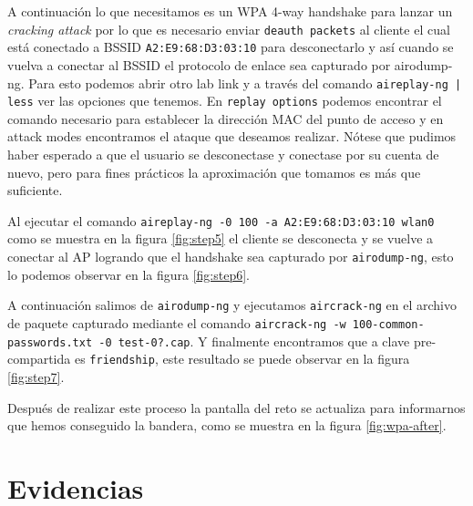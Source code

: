 \documentclass{article}
\begin{document}
        A continuación lo que necesitamos es un WPA 4-way handshake para lanzar un \emph{cracking attack} por lo que es necesario enviar \texttt{deauth packets} al cliente el cual está conectado a BSSID \texttt{A2:E9:68:D3:03:10} para desconectarlo y así cuando se vuelva a conectar al BSSID el protocolo de enlace sea capturado por airodump-ng. Para esto podemos abrir otro lab link y a través del comando \texttt{aireplay-ng | less} ver las opciones que tenemos. En \texttt{replay options} podemos encontrar el comando necesario para establecer la dirección MAC del punto de acceso y en attack modes encontramos el ataque que deseamos realizar. Nótese que pudimos haber esperado a que el usuario se desconectase y conectase por su cuenta de nuevo, pero para fines prácticos la aproximación que tomamos es más que suficiente.

        Al ejecutar el comando \texttt{aireplay-ng -0 100 -a A2:E9:68:D3:03:10 wlan0} como se muestra en la figura \ref{fig:step5} el cliente se desconecta y se vuelve a conectar al AP logrando que el handshake sea capturado por \texttt{airodump-ng}, esto lo podemos observar en la figura \ref{fig:step6}.
        
        A continuación salimos de \texttt{airodump-ng} y ejecutamos \texttt{aircrack-ng} en el archivo de paquete capturado mediante el comando \texttt{aircrack-ng -w 100-common-passwords.txt -0 test-0?.cap}. Y finalmente encontramos que a clave pre-compartida es \texttt{friendship}, este resultado se puede observar en la figura \ref{fig:step7}.

        Después de realizar este proceso la pantalla del reto se actualiza para informarnos que hemos conseguido la bandera, como se muestra en la figura \ref{fig:wpa-after}.

    
    

    \clearpage
    \appendix
    \section{Evidencias}
    
\end{document}
